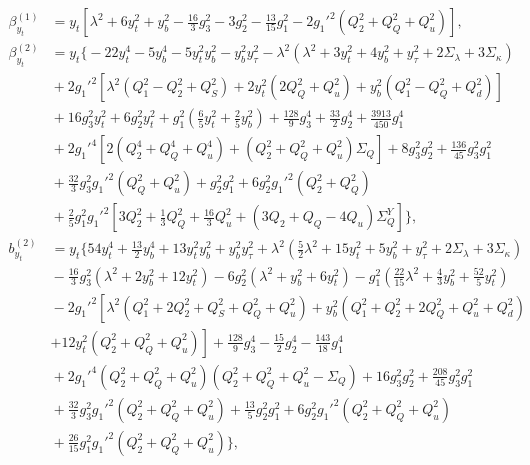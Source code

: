 \documentclass[preprint,amsmath,amssymb,aps,superscriptaddress,prd,showpacs,floatfix,nofootinbib]{revtex4-1}
\begin{document}
\begin{subequations}
\begin{align}
\beta_{y_t}^{(1)}&=y_t\left [ \lambda^2+6y_t^2+y_b^2-\frac{16}{3}g_3^2-3g_2^2-\frac{13}{15}g_1^2-2g_1'^2\left ( Q_2^2+Q_Q^2+Q_u^2 \right )\right ],\label{eq:USSMYu22BetaOneLoop}\\
\beta_{y_t}^{(2)}&=y_t\bigg \{-22y_t^4-5y_b^4-5y_t^2y_b^2-y_b^2y_\tau^2-\lambda^2 \left ( \lambda^2+3y_t^2+4y_b^2+y_\tau^2+2\Sigma_\lambda + 3\Sigma_\kappa\right )\nonumber\\
&{}+2g_1'^2\left [ \lambda^2\left ( Q_1^2-Q_2^2+Q_S^2 \right )+2y_t^2\left ( 2Q_Q^2+Q_u^2\right )+y_b^2\left ( Q_1^2-Q_Q^2+Q_d^2\right )\right ]\nonumber\\
&{}+16g_3^2y_t^2+6g_2^2y_t^2+g_1^2\left ( \frac{6}{5}y_t^2+\frac{2}{5}y_b^2\right )+\frac{128}{9}g_3^4+\frac{33}{2}g_2^4+\frac{3913}{450}g_1^4\nonumber\\
&{}+2g_1'^4\left [ 2\left ( Q_2^4+Q_Q^4+Q_u^4\right )+\left ( Q_2^2+Q_Q^2+Q_u^2\right )\Sigma_{Q}\right ]+8g_3^2g_2^2+\frac{136}{45}g_3^2g_1^2\nonumber\\
&{}+\frac{32}{3}g_3^2g_1'^2\left ( Q_Q^2+Q_u^2\right )+g_2^2g_1^2+6g_2^2g_1'^2\left ( Q_2^2+Q_Q^2\right )\nonumber\\
&{}+\frac{2}{5}g_1^2g_1'^2\left [ 3Q_2^2+\frac{1}{3}Q_Q^2+\frac{16}{3}Q_u^2+\left ( 3Q_2+Q_Q-4Q_u\right )\Sigma_Q^Y\right ]\bigg \},\label{eq:USSMYu22BetaTwoLoop}\\
b_{y_t}^{(2)}&=y_t\bigg \{ 54y_t^4+\frac{13}{2}y_b^4+13y_t^2y_b^2+y_b^2y_\tau^2+\lambda^2\left ( \frac{5}{2}\lambda^2+15y_t^2+5y_b^2+y_\tau^2+2\Sigma_\lambda+3\Sigma_\kappa \right )\nonumber\\
&{}-\frac{16}{3}g_3^2\left ( \lambda^2+2y_b^2+12y_t^2\right )-6g_2^2\left ( \lambda^2+y_b^2+6y_t^2\right )-g_1^2\left ( \frac{22}{15}\lambda^2+\frac{4}{3}y_b^2+\frac{52}{5}y_t^2\right )\nonumber\\
&{}-2g_1'^2\left [ \lambda^2 \left (Q_1^2+2Q_2^2+Q_S^2+Q_Q^2+Q_u^2 \right )+y_b^2\left ( Q_1^2+Q_2^2+2Q_Q^2+Q_u^2+Q_d^2\right )\right.\nonumber\\
&{}\left.+12y_t^2\left ( Q_2^2+Q_Q^2+Q_u^2\right )\right ]+\frac{128}{9}g_3^4-\frac{15}{2}g_2^4-\frac{143}{18}g_1^4\nonumber\\
&{}+2g_1'^4\left ( Q_2^2+Q_Q^2+Q_u^2\right )\left ( Q_2^2+Q_Q^2+Q_u^2-\Sigma_{Q}\right )+16g_3^2g_2^2+\frac{208}{45}g_3^2g_1^2\nonumber\\
&{}+\frac{32}{3}g_3^2g_1'^2\left ( Q_2^2+Q_Q^2+Q_u^2\right )+\frac{13}{5}g_2^2g_1^2+6g_2^2g_1'^2\left ( Q_2^2+Q_Q^2+Q_u^2 \right )\nonumber\\
&{}+\frac{26}{15}g_1^2g_1'^2\left ( Q_2^2+Q_Q^2+Q_u^2 \right )\bigg \},\label{eq:USSMYu22Ot2Coeff}
\end{align}
\end{subequations}
\end{document}
